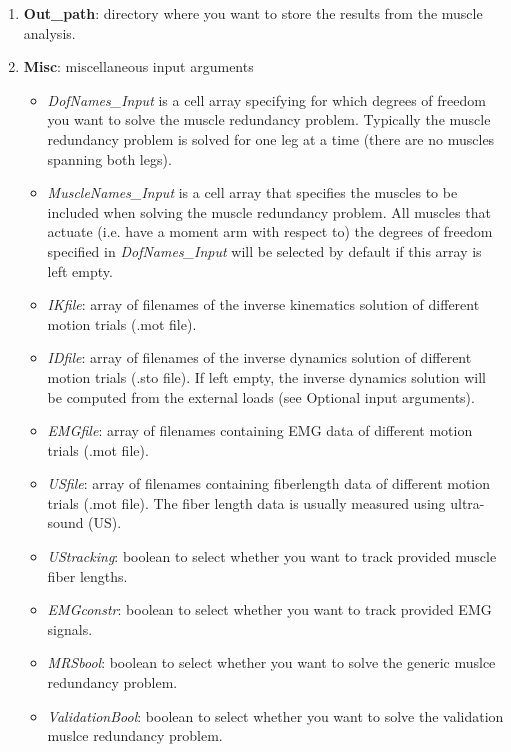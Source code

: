 \documentclass[a4paper,oneside,11pt]{article}
\begin{document}
\begin{enumerate}
	\item \textbf{Out_path}: directory where you want to store the results from the muscle analysis.
	\item \textbf{Misc}: miscellaneous input arguments
	\begin{itemize}
		\item \textit{DofNames_Input}  is a cell array specifying for which degrees of freedom you want to solve the muscle redundancy problem. Typically the muscle redundancy problem is solved for one leg at a time (there are no muscles spanning both legs).
		\item \textit{MuscleNames_Input} is a cell array that specifies the muscles to be included when solving the muscle redundancy problem. All muscles that actuate (i.e. have a moment arm with respect to) the degrees of freedom specified in \textit{DofNames_Input} will be selected by default if this array is left empty.
		\item \textit{IKfile}: array of filenames of the inverse kinematics solution of different motion trials (.mot file).
		\item \textit{IDfile}: array of filenames of the inverse dynamics solution of different motion trials (.sto file). If left empty, the inverse dynamics solution will be computed from the external loads (see Optional input arguments).
		\item \textit{EMGfile}: array of filenames containing EMG data of different motion trials (.mot file). 
		\item \textit{USfile}: array of filenames containing fiberlength data of different motion trials (.mot file). The fiber length data is usually measured using ultra-sound (US).
		\item \textit{UStracking}: boolean to select whether you want to track provided muscle fiber lengths.
		\item \textit{EMGconstr}: boolean to select whether you want to track provided EMG signals.
		\item \textit{MRSbool}: boolean to select whether you want to solve the generic muslce redundancy problem.
		\item \textit{ValidationBool}: boolean to select whether you want to solve the validation muslce redundancy problem.
	\end{itemize}
\end{enumerate}
\end{document}
